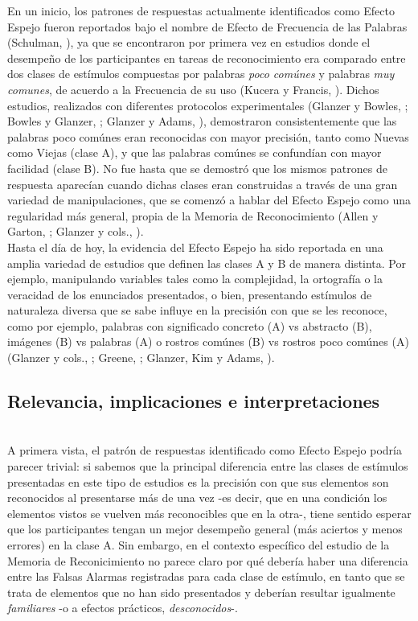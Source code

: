 En un inicio, los patrones de respuestas actualmente identificados como Efecto Espejo fueron reportados bajo el nombre de Efecto de Frecuencia de las Palabras (Schulman, \citeyear{Schulman1967}), ya que se encontraron por primera vez en estudios donde el desempeño de los participantes en tareas de reconocimiento era comparado entre dos clases de estímulos compuestas por palabras \textit{poco comúnes} y palabras \textit{muy comunes}, de acuerdo a la Frecuencia de su uso (Kucera y Francis, \citeyear{Kucera1967}). Dichos estudios, realizados con diferentes protocolos experimentales (Glanzer y Bowles, \citeyear{Glanzer1976}; Bowles y Glanzer, \citeyear{Bowles1983}; Glanzer y Adams, \citeyear{Glanzer1990}), demostraron consistentemente que las palabras poco comúnes eran reconocidas con mayor precisión, tanto como Nuevas como Viejas (clase A), y que las palabras comúnes se confundían con mayor facilidad (clase B). No fue hasta que se demostró que los mismos patrones de respuesta aparecían cuando dichas clases eran construidas a través de una gran variedad de manipulaciones, que se comenzó a hablar del Efecto Espejo como una regularidad más general, propia de la Memoria de Reconocimiento (Allen y Garton, \citeyear{Allen1968}; Glanzer y cols., \citeyear{Glanzer1993}).\\

Hasta el día de hoy, la evidencia del Efecto Espejo ha sido reportada en una amplia variedad de estudios que definen las clases A y B de manera distinta. Por ejemplo, manipulando variables tales como la complejidad, la ortografía o la veracidad de los enunciados presentados, o bien, presentando estímulos de naturaleza diversa que se sabe influye en la precisión con que se les reconoce, como por ejemplo, palabras con significado concreto (A) vs abstracto (B), imágenes (B) vs palabras (A) o rostros comúnes (B) vs rostros poco comúnes (A) (Glanzer y cols., \citeyear{Glanzer1993}; Greene, \citeyear{Greene1996}; Glanzer, Kim y Adams, \citeyear{Glanzer1998}).\\

\subsection{Relevancia, implicaciones e interpretaciones}\\

A primera vista, el patrón de respuestas identificado como Efecto Espejo podría parecer trivial: si sabemos que la principal diferencia entre las clases de estímulos presentadas en este tipo de estudios es la precisión con que sus elementos son reconocidos al presentarse más de una vez -es decir, que en una condición los elementos vistos se vuelven más reconocibles que en la otra-, tiene sentido esperar que los participantes tengan un mejor desempeño general (más aciertos y menos errores) en la clase A. Sin embargo, en el contexto específico del estudio de la Memoria de Reconicimiento no parece claro por qué debería haber una diferencia entre las Falsas Alarmas registradas para cada clase de estímulo, en tanto que se trata de elementos que no han sido presentados y deberían resultar igualmente \textit{familiares} -o a efectos prácticos, \textit{desconocidos}-.\\

